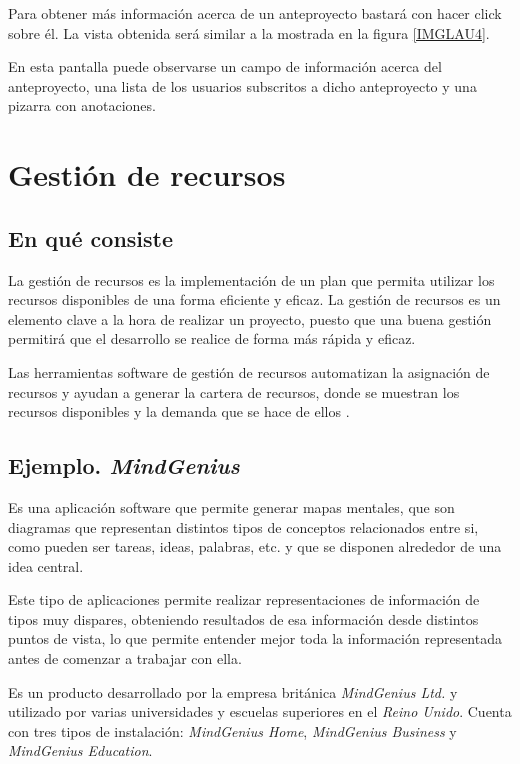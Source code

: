 \documentclass[11pt,a4paper,spanish,twoside]{report}
\begin{document}
	Para obtener más información acerca de un anteproyecto bastará con hacer
	click sobre él. La vista obtenida será similar a la mostrada en la figura
	\ref{IMGLAU4}.
		

	En esta pantalla puede observarse un campo de información acerca del
	anteproyecto, una lista de los usuarios subscritos a dicho anteproyecto y
	una pizarra con anotaciones.

\chapter{Gestión de recursos}
\section{En qué consiste}
La gestión de recursos es la implementación de un plan que permita utilizar
los recursos disponibles de una forma eficiente y eficaz. La gestión de
recursos es un elemento clave a la hora de realizar un proyecto, puesto que
una buena gestión permitirá que el desarrollo se realice de forma más rápida
y eficaz.

Las herramientas software de gestión de recursos automatizan la asignación de
recursos y ayudan a generar la cartera de recursos, donde se muestran los
recursos disponibles y la demanda que se hace de ellos \cite{WRS}.

\section{Ejemplo. \emph{MindGenius}}
Es una aplicación software que permite generar mapas mentales, que son
diagramas que representan distintos tipos de conceptos relacionados entre si,
como pueden ser tareas, ideas, palabras, etc. y que se disponen alrededor de
una idea central.

Este tipo de aplicaciones permite realizar representaciones de información de
tipos muy dispares, obteniendo resultados de esa información desde distintos
puntos de vista, lo que permite entender mejor toda la información
representada antes de comenzar a trabajar con ella.

Es un producto desarrollado por la empresa británica \emph{MindGenius Ltd.}
\cite{MGE} y utilizado por varias universidades y escuelas superiores en el
\emph{Reino Unido}. Cuenta con tres tipos de instalación: \emph{MindGenius
  Home}, \emph{MindGenius Business} y \emph{MindGenius Education}. 
\end{document}
